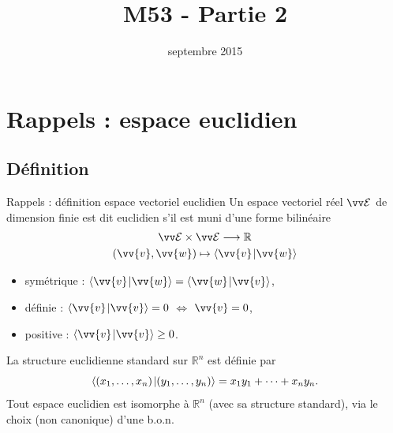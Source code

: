 \documentclass[bigger]{m53beamer}
\title{M53 - Partie 2}
\date{septembre 2015}
\begin{document}
\begin{frame}
  \titlepage
\end{frame}

\section{Rappels : espace euclidien}
\subsection{Définition}
\begin{frame}{Rappels : définition espace vectoriel euclidien}
  Un espace vectoriel réel $\ev{E}$ de dimension finie est dit \alert{euclidien} s'il est muni d'une forme bilinéaire
    \begin{gather*}
      \ev{E} \times \ev{E} \longrightarrow \mathbb{R}\\
      (\vv{v},\vv{w}) \mapsto \scalprod{\vv{v}}{\vv{w}}
    \end{gather*}\vspace*{-1.4\baselineskip}
    \begin{itemize}[<+(1)->]
      \item symétrique : $\scalprod{\vv{v}}{\vv{w}} = \scalprod{\vv{w}}{\vv{v}}$,
      \item définie : $\scalprod{\vv{v}}{\vv{v}} = 0$ $\Leftrightarrow$ $\vv{v} = 0$,
      \item positive : $\scalprod{\vv{v}}{\vv{v}} \geq 0$.
    \end{itemize}\pause
  La structure euclidienne standard sur $\mathbb{R}^{n}$ est définie par
  \vspace*{-.7\baselineskip}
  \[
    \langle{(x_{1},\ldots,x_{n})}\kern1pt |{(y_{1},\ldots,y_{n})}\rangle=x_{1}y_{1}+\cdots+x_{n}y_{n}.
  \]\pause
  Tout espace euclidien est isomorphe à $\mathbb{R}^{n}$ (avec sa structure standard),\pause
  via le choix (non canonique) d'une b.o.n.
\end{frame}

\end{document}
